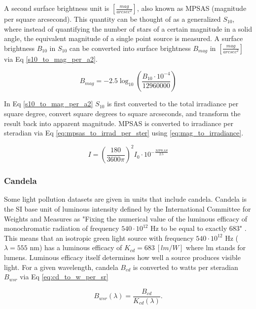 A second surface brightness unit is $\left[ \frac{mag}{arcsec^2} \right]$, also known as MPSAS (magnitude per square arcsecond). This quantity can be thought of as a generalized $S_{10}$, where instead of quantifying the number of stars of a certain
magnitude in a solid angle, the equivalent magnitude of a single point source is measured. A surface
brightness $B_{10}$ in $S_{10}$ can be converted into surface brightness $B_{mag}$ in 
$\left[ \frac{mag}{arcsec^2} \right]$ via Eq \ref{s10_to_mag_per_a2}.

\begin{equation} \label{s10_to_mag_per_a2}
	B_{mag} = -2.5 \log_{10}\left( \frac{B_{10} \cdot 10^{-4}}{12960000} \right)
\end{equation}

In Eq \ref{s10_to_mag_per_a2} $S_{10}$ is first converted to the total irradiance per square degree,
convert square degrees to square arcseconds, and transform the result back into apparent magnitude. MPSAS is converted to irradiance per steradian via Eq \ref{eq:mpsas_to_irrad_per_ster} using \ref{eq:mag_to_irradiance}.

\begin{equation} \label{eq:mpsas_to_irrad_per_ster}
  I = \left( \frac{180}{ 3600\pi} \right)^2 I_0 \cdot 10^{-\frac{MPSAS}{2.5}}
\end{equation}

\subsubsection{Candela} \label{sec:candela}

Some light pollution datasets are given in units that include candela. Candela is the SI base unit of luminous intensity defined by the International Committee for Weights and Measures as "Fixing the numerical value of the luminous efficacy of monochromatic radiation of frequency $540\cdot10^{12}$ Hz to be equal to exactly $683$" \cite{nist_units}. This means that an isotropic green light source with frequency $540\cdot10^{12}$ Hz ($\lambda = 555$ nm) has a luminous efficacy of $K_{cd} = 683 \: \left[ lm/W \right]$ where lm stands for lumens. Luminous efficacy itself determines how well a source produces visible light. For a given wavelength, candela $B_{cd}$ is converted to watts per steradian $B_{wsr}$ via Eq \ref{eq:cd_to_w_per_sr} \cite{nist_units}

\begin{equation} \label{eq:cd_to_w_per_sr}
  B_{wsr}(\lambda) = \frac{B_{cd}}{K_{cd}(\lambda)}.
\end{equation}

